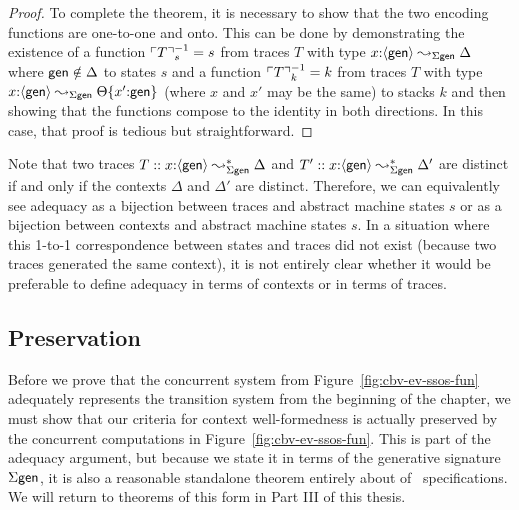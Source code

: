 \begin{proof}
To complete the theorem, it is necessary to show that the two encoding
functions are one-to-one and onto. This can be done by demonstrating
the existence of a function $^{-1}_s = s$ from traces $T$
with type $x{:} \leadsto_{\Sigma\sf gen} \Delta$ where
${\sf gen} \notin \Delta$ to states $s$ and a function
$^{-1}_k = k$ from traces $T$ with type $x{:}
\leadsto_{\Sigma\sf gen} $ (where $x$
and $x'$ may be the same) to stacks $k$ and then showing that
the functions compose to the identity in both directions. In this case,
that proof is tedious but straightforward.
\end{proof}

Note that two traces $T :: x{:} \leadsto^*_{\Sigma\sf
  gen} \Delta$ and $T' :: x{:} \leadsto^*_{\Sigma\sf
  gen} \Delta'$ are distinct if and only if the contexts $\Delta$ and
$\Delta'$ are distinct. Therefore, we can equivalently see adequacy as
a bijection between traces and abstract machine states $s$ or as a
bijection between contexts and abstract machine states $s$. In a
situation where this 1-to-1 correspondence between states and traces
did not exist (because two traces generated the same context), it is
not entirely clear whether it would be preferable to define adequacy in
terms of contexts or in terms of traces.

\subsection{Preservation}
\label{sec:nat-ssos-adequacy-pres}

Before we prove that the concurrent system from
Figure~\ref{fig:cbv-ev-ssos-fun} adequately represents the transition
system from the beginning of the chapter, we must show that our
criteria for context well-formedness is actually preserved by the
concurrent computations in Figure~\ref{fig:cbv-ev-ssos-fun}. This is
part of the adequacy argument, but because we state it in terms of the
generative signature $\Sigma\sf gen$, it is also a reasonable
standalone theorem entirely about of \sls~specifications. We will
return to theorems of this form in Part III of this thesis.

